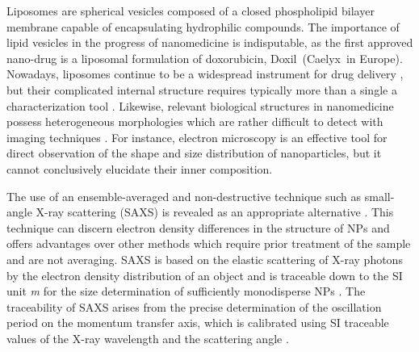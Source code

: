 Liposomes are spherical vesicles composed of a closed phospholipid bilayer membrane capable of encapsulating hydrophilic compounds. The importance of lipid vesicles in the progress of nanomedicine is indisputable, as the first approved nano-drug is a liposomal formulation of doxorubicin, Doxil\textregistered\ (Caelyx\textregistered\ in Europe). Nowadays, liposomes continue to be a widespread instrument for drug delivery \citep{perez-herrero_advanced_2015}, but their complicated internal structure requires typically more than a single a characterization tool \citep{khorasani_closing_2014}. Likewise, relevant biological structures in nanomedicine possess heterogeneous morphologies which are rather difficult to detect with imaging techniques \citep{baumstark_structure_1990,varga_closer_2010}. For instance, electron microscopy is an effective tool for direct observation of the shape and size distribution of nanoparticles, but it cannot conclusively elucidate their inner composition.

The use of an ensemble-averaged and non-destructive technique such as small-angle X-ray scattering (SAXS) is revealed as an appropriate alternative \citep{leonard_jr_size_1952,motzkus_untersuchung_1959}. This technique can discern electron density differences in the structure of NPs and offers advantages over other methods which require prior treatment of the sample and are not averaging. SAXS is based on the elastic scattering of X-ray photons by the electron density distribution of an object and is traceable down to the SI unit \emph{m} for the size determination of sufficiently monodisperse NPs \citep{meli_traceable_2012}. The traceability of SAXS arises from the precise determination of the oscillation period on the momentum transfer axis, which is calibrated using SI traceable values of the X-ray wavelength and the scattering angle \citep{krumrey_synchrotron_2011}.

